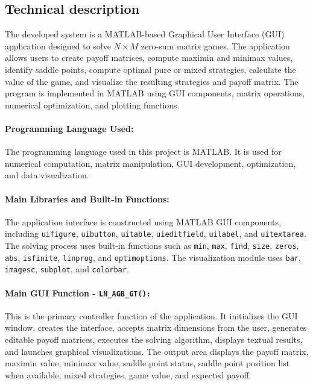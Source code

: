 \subsection{Technical description}

The developed system is a MATLAB-based Graphical User Interface (GUI) application designed to solve \(N \times M\) zero-sum matrix games. The application allows users to create payoff matrices, compute maximin and minimax values, identify saddle points, compute optimal pure or mixed strategies, calculate the value of the game, and visualize the resulting strategies and payoff matrix. The program is implemented in MATLAB using GUI components, matrix operations, numerical optimization, and plotting functions.

\paragraph{Programming Language Used:}

The programming language used in this project is MATLAB. It is used for numerical computation, matrix manipulation, GUI development, optimization, and data visualization.

\paragraph{Main Libraries and Built-in Functions:}

The application interface is constructed using MATLAB GUI components, including \texttt{uifigure}, \texttt{uibutton}, \texttt{uitable}, \texttt{uieditfield}, \texttt{uilabel}, and \texttt{uitextarea}. The solving process uses built-in functions such as \texttt{min}, \texttt{max}, \texttt{find}, \texttt{size}, \texttt{zeros}, \texttt{abs}, \texttt{isfinite}, \texttt{linprog}, and \texttt{optimoptions}. The visualization module uses \texttt{bar}, \texttt{imagesc}, \texttt{subplot}, and \texttt{colorbar}.

\paragraph{Main GUI Function - \texttt{LN\_AGB\_GT():}}

This is the primary controller function of the application. It initializes the GUI window, creates the interface, accepts matrix dimensions from the user, generates editable payoff matrices, executes the solving algorithm, displays textual results, and launches graphical visualizations. The output area displays the payoff matrix, maximin value, minimax value, saddle point status, saddle point position list when available, mixed strategies, game value, and expected payoff.

